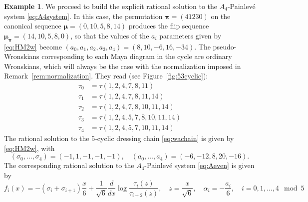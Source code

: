 \documentclass{amsart}
\theoremstyle{definition}
\newtheorem*{example}{Example} %
\newcommand{\bmu}{{\boldsymbol{\mu}}}
\newcommand{\bpi}{{\boldsymbol{\pi}}}
\begin{document}
\begin{example}
We proceed to build the explicit rational solution to the
$A_4$-Painlev\'e system \eqref{eq:A4system}. In this case, the
permutation $\bpi=(41230)$ on the canonical sequence
$\bmu=(0,10,5,8,14)$ produces the flip sequence
$\bmu_\bpi=(14,10,5,8,0)$, so that the values of the $a_i$
parameters given by \eqref{eq:HM2w} become
$(a_0,a_1,a_2,a_3,a_4)=(8,10,-6,16,-34)$. The
pseudo-Wronskians corresponding to each Maya diagram in the cycle are
ordinary Wronskians, which will always be the case with the
normalization imposed in Remark~\ref{rem:normalization}. They read
(see Figure~\ref{fig:53cyclic}):
\begin{align*}
\tau_0&=\tau(1,2,4,7,8,11)\\
\tau_1&=\tau(1,2,4,7,8,{11},{14})\\
\tau_2&=\tau(1,2,4,7,8,{10},{11},{14})\\
\tau_3&=\tau(1,2,4,5,7,8,{10},{11},{14})\\
\tau_4&=\tau(1,2,4,5,7,{10},{11},{14})
\end{align*}
The rational solution to the $5$-cyclic dressing
chain \eqref{eq:wachain} is given by  \eqref{eq:HM2w},  with
\[ (\sigma_0,\ldots, \sigma_4) = (-1,1,-1,-1,-1),\quad (a_0,\ldots,
  a_4) = (-6,-12,8,20,-16).\] The corresponding rational solution to
the $A_4$-Painlev\'e system \eqref{eq:Aeven} is given by
\[
  f_i(x) = - (\sigma_i+\sigma_{i+1})\frac{x}{6} +\frac{1}{\sqrt{6}}
  \frac{d}{dx} \log \frac{\tau_{i}(z)}{\tau_{i+2}(z)} ,\quad z=
  \frac{x}{\sqrt{6}},\quad \alpha_i = -\frac{a_i}6,\quad
  i=0,1,\ldots, 4 \mod 5
\]

\end{example}
\end{document}
